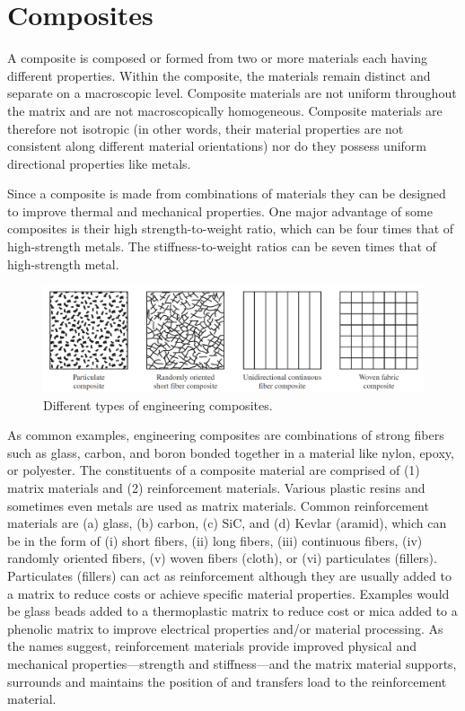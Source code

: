 \documentclass[
10pt,
a4paper,
openany,
svgnames,
]{book}
\begin{document}
\section{Composites}

A composite is composed or formed from two or more materials each having different properties. Within the composite, the materials remain distinct and separate on a macroscopic level. Composite materials are not uniform throughout the matrix and are not macroscopically homogeneous. Composite materials are therefore not isotropic (in other words, their material properties are not consistent along different material orientations) nor do they possess uniform directional properties like metals.

Since a composite is made from combinations of materials they can be designed to improve thermal and mechanical properties. One major advantage of some composites is their high strength-to-weight ratio, which can be four times that of high-strength metals. The stiffness-to-weight ratios can be seven times that of high-strength metal.

\begin{figure}[h]
  \centering
  \includegraphics[width=\textwidth]{pictures/Material-selection/composites}
  \begin{tikzpicture}
  \end{tikzpicture}
  \caption{Different types of engineering composites. \cite{shigley2011shigley}}
\end{figure}

As common examples, engineering composites are combinations of strong fibers such as glass, carbon, and boron bonded together in a material like nylon, epoxy, or polyester. The constituents of a composite material are comprised of (1) matrix materials and (2) reinforcement materials. Various plastic resins and sometimes even metals are used as matrix materials. Common reinforcement materials are (a) glass, (b) carbon, (c) SiC, and (d) Kevlar (aramid), which can be in the form of (i) short fibers, (ii) long fibers, (iii) continuous fibers, (iv) randomly oriented fibers, (v) woven fibers (cloth), or (vi) particulates (fillers). Particulates (fillers) can act as reinforcement although they are usually added to a matrix to reduce costs or achieve specific material properties. Examples would be glass beads added to a thermoplastic matrix to reduce cost or mica added to a phenolic matrix to improve electrical properties and/or material processing. As the names suggest, reinforcement materials provide improved physical and mechanical properties—strength and stiffness—and the matrix material supports, surrounds and maintains the position of and transfers load to the reinforcement material.
\end{document}
